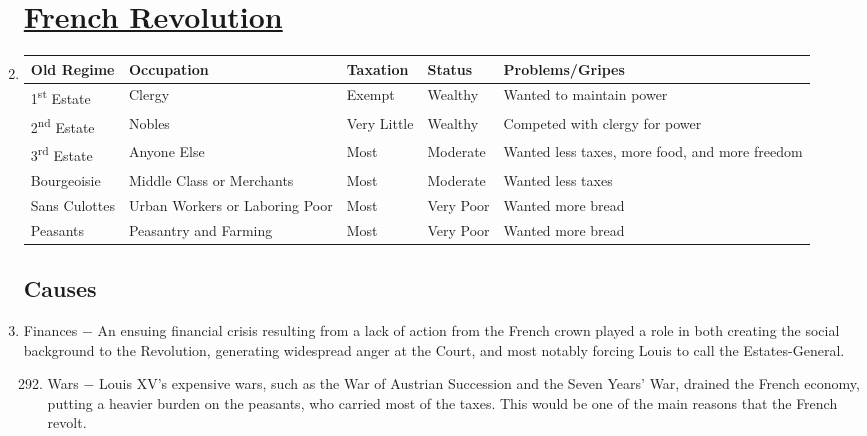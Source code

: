 \documentclass[12pt]{article}
\begin{document}
\begin{enumerate}
\section{\underline{French Revolution}} 

\item \begin{tabular}{p{} p{} p{} p{} p{}}

Old Regime & Occupation & Taxation & Status & Problems/Gripes\\
\hline
1\textsuperscript{st} Estate & Clergy & Exempt & Wealthy & Wanted to maintain power \\
\hline
2\textsuperscript{nd} Estate & Nobles & Very Little & Wealthy & Competed with clergy for power \\
\hline
3\textsuperscript{rd} Estate & Anyone Else & Most & Moderate & Wanted less taxes, more food, and more freedom \\
\hline
Bourgeoisie & Middle Class or Merchants & Most & Moderate & Wanted less taxes \\
\hline
Sans Culottes & Urban Workers or Laboring Poor & Most & Very Poor & Wanted more bread  \\
\hline
Peasants & Peasantry and Farming & Most & Very Poor & Wanted more bread \\
\hline

\end{tabular}

\subsection{Causes}

\item Finances $-$ An ensuing financial crisis resulting from a lack of action from the French crown played a role in both creating the social background to the Revolution, generating widespread anger at the Court, and most notably forcing Louis to call the Estates-General. 

\begin{enumerate}[label=\arabic{*}.]
\setcounter{enumii}{291}

\item Wars $-$ Louis XV's expensive wars, such as the War of Austrian Succession and the Seven Years' War, drained the French economy, putting a heavier burden on the peasants, who carried most of the taxes. This would be one of the main reasons that the French revolt.


\end{enumerate}
\end{enumerate}
\end{document}
